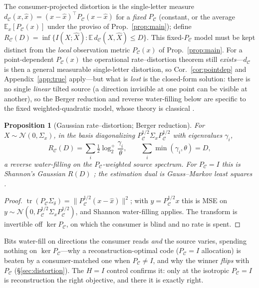 \documentclass[11pt]{article}
\newtheorem{proposition}{Proposition}
\theoremstyle{definition}
\theoremstyle{remark}
\newcommand{\PC}{P_{\mathcal{C}}}
\newcommand{\Sd}{\Sigma_{\delta}}
\newcommand{\tr}{\operatorname{tr}}
\newcommand{\E}{\mathbb{E}}
\begin{document}
The consumer-projected distortion is the single-letter measure
$d_{\mathcal{C}}(x,\hat x)=(x-\hat x)^\top\PC(x-\hat x)$ for a \emph{fixed} $\PC$
(constant, or the average $\E_x[\PC(x)]$ under the proviso of Prop.~\ref{prop:main});
define $R_{\mathcal{C}}(D)=\inf\{I(X;\hat X):\E\,d_{\mathcal{C}}(X,\hat X)\le D\}$.
This fixed-$\PC$ model must be kept distinct from the \emph{local} observation metric
$\PC(x)$ of Prop.~\ref{prop:main}. For a point-dependent $\PC(x)$ the operational
rate--distortion theorem still \emph{exists}---$d_{\mathcal{C}}$ is then a general
measurable single-letter distortion, so Cor.~\ref{cor:pointdep} and
Appendix~\ref{app:true} apply---but what is \emph{lost} is the closed-form solution:
there is no single \emph{linear} tilted source (a direction invisible at one point can
be visible at another), so the Berger reduction and reverse water-filling below are
specific to the fixed weighted-quadratic model, whose theory is classical
\cite{berger1971}.

\begin{proposition}[Gaussian rate--distortion; Berger reduction]\label{prop:rd}
For $X\sim\mathcal{N}(0,\Sigma_x)$, in the basis diagonalizing
$\PC^{1/2}\Sigma_x\PC^{1/2}$ with eigenvalues $\gamma_i$,
\[
R_{\mathcal{C}}(D)=\sum_i \tfrac12\log_2^{+}\!\frac{\gamma_i}{\theta},\qquad
\sum_i\min(\gamma_i,\theta)=D,
\]
a reverse water-filling on the $\PC$-weighted source spectrum. For $\PC=I$ this is
Shannon's Gaussian $R(D)$ \cite{shannon1959}; the estimation dual is Gauss--Markov
least squares \cite{gauss1809}.
\end{proposition}
\begin{proof}
$\tr(\PC\Sd)=\|\PC^{1/2}(x-\hat x)\|^2$; with $y=\PC^{1/2}x$ this is MSE on
$y\sim\mathcal{N}(0,\PC^{1/2}\Sigma_x\PC^{1/2})$, and Shannon water-filling applies.
The transform is invertible off $\ker\PC$, on which the consumer is blind and no rate
is spent.
\end{proof}

Bits water-fill on directions the consumer reads \emph{and} the source varies,
spending nothing on $\ker\PC$---why a reconstruction-optimal code ($\PC=I$
allocation) is beaten by a consumer-matched one when $\PC\ne I$, and why the winner
\emph{flips} with $\PC$ (\S\ref{sec:distortion}). The $H=I$ control confirms it: only
at the isotropic $\PC=I$ is reconstruction the right objective, and there it is
exactly right.
\end{document}
